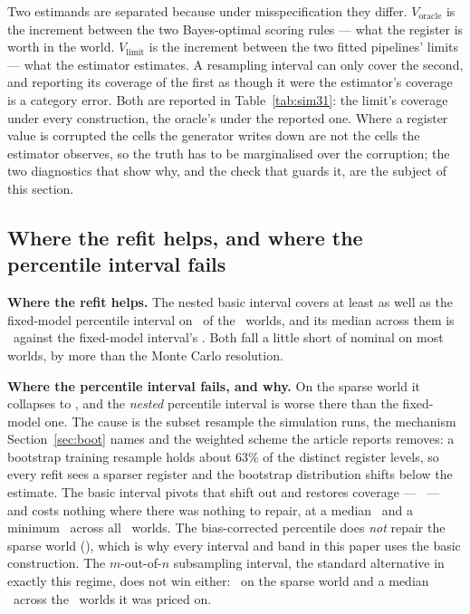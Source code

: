 Two estimands are separated because under misspecification they differ.
$V_{\mathrm{oracle}}$ is the increment between the two Bayes-optimal scoring
rules --- what the register is worth in the world. $V_{\mathrm{limit}}$ is the
increment between the two fitted pipelines' limits --- what the estimator
estimates. A resampling interval can only cover the second, and reporting its
coverage of the first as though it were the estimator's coverage is a category
error. Both are reported in Table~\ref{tab:sim31}: the limit's coverage under
every construction, the oracle's under the reported one. Where a register value is
corrupted the cells the generator writes down are not the cells the estimator
observes, so the truth has to be marginalised over the corruption; the two
diagnostics that show why, and the check that guards it, are the subject of
this section.

\subsection{Where the refit helps, and where the percentile interval fails}
\label{app:refit}


\textbf{Where the refit helps.} The nested basic interval covers at least as
well as the fixed-model percentile interval on \nWorldsNestedAtLeastNaive\ of
the \nWorldsSim\ worlds, and its median across them is
\coverageNestedBasicMedian\ against the fixed-model interval's
\coverageNaiveMedian. Both fall a little short of nominal on most worlds, by
more than the Monte Carlo resolution.

\textbf{Where the percentile interval fails, and why.} On the sparse world it
collapses to \coverageSparsePct, and the \emph{nested} percentile interval is
worse there than the fixed-model one. The cause is the subset resample the
simulation runs, the mechanism Section~\ref{sec:boot} names and the weighted
scheme the article reports removes: a bootstrap training resample holds about
$63\%$ of the distinct register levels, so every refit sees a sparser register and the bootstrap distribution
shifts below the estimate. The basic interval pivots that shift out and
restores coverage --- \coverageSparseBasic\ --- and costs nothing where there
was nothing to repair, at a median \coverageNestedBasicMedian\ and a minimum
\coverageNestedBasicMin\ across all \nWorlds\ worlds. The bias-corrected
percentile does \emph{not} repair the sparse world (\coverageSparseBc), which
is why every interval and band in this paper uses the basic construction. The
$m$-out-of-$n$ subsampling interval, the standard alternative in exactly this
regime, does not win either: \coverageSparseMofn\ on the sparse world and a
median \coverageMofnMedian\ across the \nWorldsMofnPriced\ worlds it was
priced on.

